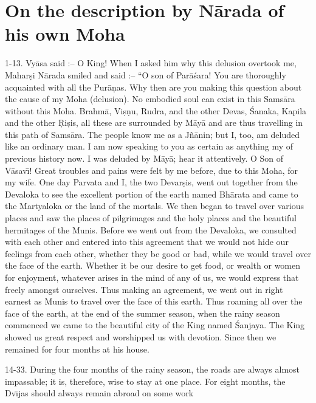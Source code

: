 \chapter{On the description by N\=arada of his own Moha}

1-13. Vy\=asa said :-- O King! When I asked him why this delusion overtook me, Mahar\d{s}i N\=arada smiled and said :-- ``O son of Par\=a\'sara! You are thoroughly acquainted with all the Pur\=a\d{n}as. Why then are you making this question about the cause of my Moha (delusion). No embodied soul can exist in this Sams\=ara without this Moha. Brahm\=a, Vi\d{s}\d{n}u, Rudra, and the other Devas, \'Sanaka, Kapila and the other \d{R}i\d{s}is, all these are surrounded by M\=ay\=a and are thus travelling in this path of Sams\=ara. The people know me as a J\~n\=anin; but I, too, am deluded like an ordinary man. I am now speaking to you as certain as anything my of previous history now. I was deluded by M\=ay\=a; hear it attentively. O Son of V\=asav\={\i}! Great troubles and pains were felt by me before, due to this Moha, for my wife. One day Parvata and I, the two Devar\d{s}is, went out together from the Devaloka to see the excellent portion of the earth named Bh\=arata and came to the Martyaloka or the land of the mortals. We then began to travel over various places and saw the places of pilgrimages and the holy places and the beautiful hermitages of the Munis. Before we went out from the Devaloka, we consulted with each other and entered into this agreement that we would not hide our feelings from each other, whether they be good or bad, while we would travel over the face of the earth. Whether it be our desire to get food, or wealth or women for enjoyment, whatever arises in the mind of any of us, we would express that freely amongst ourselves. Thus making an agreement, we went out in right earnest as Munis to travel over the face of this earth. Thus roaming all over the face of the earth, at the end of the summer season, when the rainy season commenced we came to the beautiful city of the King named \'Sanjaya. The King showed us great respect and worshipped us with devotion. Since then we remained for four months at his house.

14-33. During the four months of the rainy season, the roads are always almost impassable; it is, therefore, wise to stay at one place. For eight months, the Dv\={\i}jas should always remain abroad on some work

